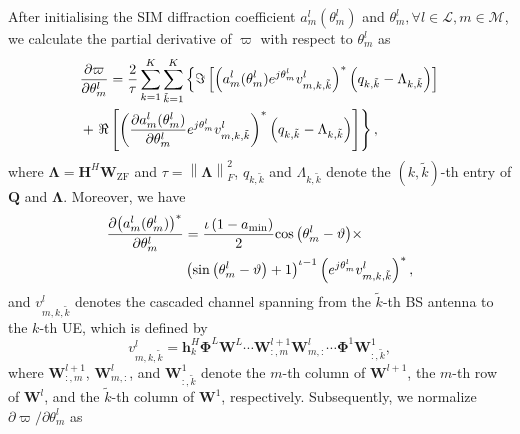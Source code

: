 \documentclass[conference]{IEEEtran}
\theoremstyle{remark}
\begin{document}
After initialising the SIM diffraction coefficient $a_{m}^{l}( {\theta}_{m}^{l}) $ and $ {\theta}_{m}^{l},\forall l\in\mathcal{L},m\in\mathcal{M} $, we calculate the partial derivative of $ {\varpi}$ with respect to ${\theta}_{m}^{l}$ as
\begin{align}\label{gradient_SIM}
&\frac{\partial \varpi}{\partial {\theta}_{m}^{l}} =\frac{2}{\tau} \sum_{k=1}^{K} \sum_{\tilde{k}=1}^{K} \left\{ \Im\left[\left( a_{m}^{l}( {\theta}_{m}^{l}) e^{j{\theta}_{m}^{l}} v_{m, k, \tilde{k}}^{l} \right)^{*}\left( {q_{k, \tilde{k}}}-\Lambda_{k, \tilde{k}}\right)\right] \right. \notag\\
& +\left. \Re \left[\left( \frac{\partial {a_{m}^{l}( {\theta}_{m}^{l})}}{\partial {\theta}_{m}^{l}} e^{j{\theta}_{m}^{l}} v_{m, k, \tilde{k}}^{l} \right)^{*}\left( {q_{k, \tilde{k}}} -\Lambda_{k, \tilde{k}}\right)\right] \right\},
\end{align}
where $\mathbf{\Lambda}=\mathbf{H}^{H}\mathbf{W}_{\text{ZF}}$ and $\tau={\left \| \mathbf{\Lambda} \right \|_{F}^{2}}$,
$q_{k, \tilde{k}}$ and $\Lambda_{k, \tilde{k}}$ denote the $(k, \tilde{k})$-th entry of $\mathbf{Q}$ and $\mathbf{\Lambda}$. 
Moreover, we have
\begin{align}
\frac{\partial {\left( {a_{m}^{l}( {\theta}_{m}^{l})} \right)}^{*} } { \partial { \theta}_{m}^{l}} &=
 \frac {{\iota} \left(1-a_\text{min}\right) }{2} {\cos \left( {\theta}_{m}^{l} -\vartheta \right)} \times \notag\\ 
&\left( {\sin \left( {\theta}_{m}^{l} -\vartheta \right)+1 } \right)^{\iota-1 } \left({e^{j{\theta}_{m}^{l}} 
 {v}_{m, k, \tilde{k}}^{l} } \right)^*,
\end{align}
and $v_{m, k, \tilde{k}}^{l}$ denotes the cascaded channel spanning from the $\tilde{k}$-th BS antenna to the $k$-th UE, which is defined by
\begin{equation}\label{equ_vmkk}
{v}_{m, k, \tilde{k}}^{l}=\mathbf{h}^{H}_{k} \boldsymbol{\Phi}^{L} \mathbf{W}^{L} \cdots \mathbf{W}_{:, m}^{l+1} \mathbf{W}_{m,:}^{l} \cdots \boldsymbol{\Phi}^{1} \mathbf{W}^{1}_{{:, \tilde{k}}},
\end{equation} 
where $\mathbf{W}_{:, m}^{l+1}$, $\mathbf{W}_{m,:}^{l}$, and $\mathbf{W}^{1}_{{:, \tilde{k}}}$ denote the $m$-th column of 
$\mathbf{W}^{l+1}$, the $m$-th row of $\mathbf{W}^{l}$, and the $\tilde{k}$-th column of $\mathbf{W}^{1}$, respectively.
Subsequently, we normalize ${\partial \varpi}/{\partial {\theta}_{m}^{l} }$ as
\end{document}
